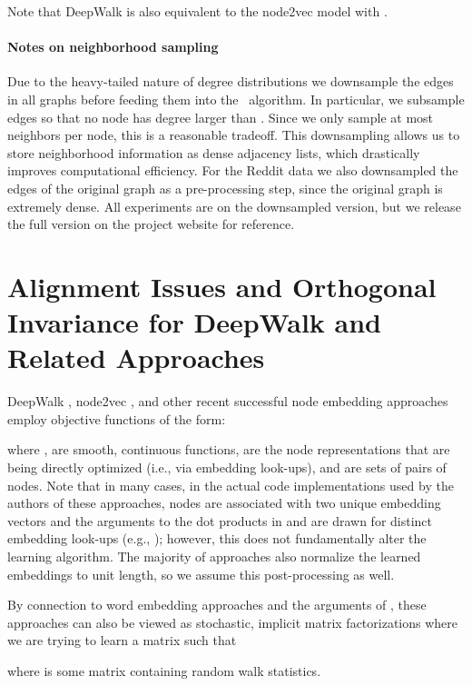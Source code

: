 Note that DeepWalk is also equivalent to the node2vec model \cite{grover2016node2vec} with . 

\paragraph{Notes on neighborhood sampling}
Due to the heavy-tailed nature of degree distributions we downsample the edges in all graphs before feeding them into the \name\ algorithm.
In particular, we subsample edges so that no node has degree larger than . 
Since we only sample at most  neighbors per node, this is a reasonable tradeoff.
This downsampling allows us to store neighborhood information as dense adjacency lists, which drastically improves computational efficiency. 
For the Reddit data we also downsampled the edges of the original graph as a pre-processing step, since the original graph is extremely dense. 
All experiments are on the downsampled version, but we release the full version on the project website for reference. 


\section{Alignment Issues and Orthogonal Invariance for DeepWalk and Related Approaches}\label{inductive:sec:rotational}

DeepWalk \cite{perozzi2014deepwalk}, node2vec \cite{grover2016node2vec}, and other recent successful node embedding approaches employ objective functions of the form:

where ,  are smooth, continuous functions,  are the node representations that are being directly optimized (i.e., via embedding look-ups), and  are sets of pairs of nodes. 
Note that in many cases, in the actual code implementations used by the authors of these approaches, nodes are associated with two unique embedding vectors and the arguments to the dot products in  and  are drawn for distinct embedding look-ups (e.g., \cite{grover2016node2vec,perozzi2014deepwalk}); however, this does not fundamentally alter the learning algorithm. 
The majority of approaches also normalize the learned embeddings to unit length, so we assume this post-processing as well.

By connection to word embedding approaches and the arguments of \cite{levy2014neural}, these approaches can also be viewed as stochastic, implicit matrix factorizations where we are trying to learn a matrix  such that

where  is some matrix containing random walk statistics. 

